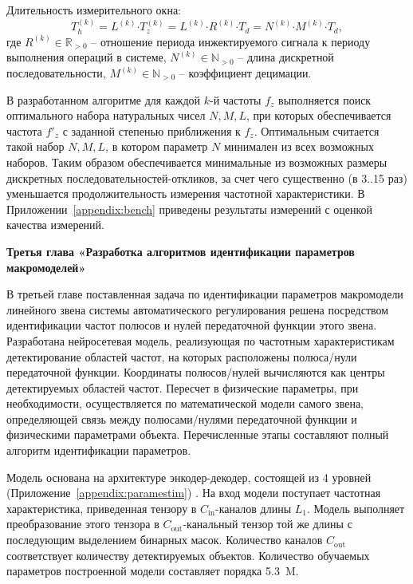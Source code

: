 \documentclass[a4paper, 14pt]{extarticle}
\begin{document}
    Длительность измерительного окна:
    \begin{equation*}
        T^{(k)}_{h} = L^{(k)} \mathord{\cdot} T^{(k)}_{z} = L^{(k)} \mathord{\cdot} R^{(k)} \mathord{\cdot} T_{d} = N^{(k)} \mathord{\cdot} M^{(k)} \mathord{\cdot} T_d,
    \end{equation*}
    где ${R^{(k)} \in \mathbb{R}_{>0}}$ -- отношение периода инжектируемого сигнала к периоду выполнения операций в системе, ${N^{(k)} \in \mathbb{N}_{>0}}$ -- длина дискретной последовательности, ${M^{(k)} \in \mathbb{N}_{>0}}$ -- коэффициент децимации.

    В разработанном алгоритме для каждой $k$-й частоты ${f_z}$ выполняется поиск оптимального набора натуральных чисел ${N, M, L}$, при которых обеспечивается частота ${f'_z}$ с заданной степенью приближения к ${f_z}$. Оптимальным считается такой набор ${N, M, L}$, в котором параметр $N$ минимален из всех возможных наборов. Таким образом обеспечивается минимальные из возможных размеры дискретных последовательностей-откликов, за счет чего существенно (в 3..15 раз) уменьшается продолжительность измерения частотной характеристики. В Приложении~\ref{appendix:bench} приведены результаты измерений с оценкой качества измерений.

    \noindent\textbf{Третья глава «Разработка алгоритмов идентификации параметров макромоделей»}\par
    В третьей главе поставленная задача по идентификации параметров макромодели линейного звена системы автоматического регулирования решена посредством идентификации частот полюсов и нулей передаточной функции этого звена. Разработана нейросетевая модель, реализующая по частотным характеристикам детектирование областей частот, на которых расположены полюса/нули передаточной функции. Координаты полюсов/нулей вычисляются как центры детектируемых областей частот. Пересчет в физические параметры, при необходимости, осуществляется по математической модели самого звена, определяющей связь между полюсами/нулями передаточной функции и физическими параметрами объекта. Перечисленные этапы составляют полный алгоритм идентификации параметров.

    Модель основана на архитектуре энкодер-декодер, состоящей из 4 уровней (Приложение~\ref{appendix:paramestim}) \cite{gorbunov2026freqrespencoder}. На вход модели поступает частотная характеристика, приведенная тензору в ${C_{\text{in}}}$-каналов длины ${L_1}$. Модель выполняет преобразование этого тензора в ${C_{\text{out}}}$-канальный тензор той же длины с последующим выделением бинарных масок. Количество каналов ${C_\text{out}}$ соответствует количеству детектируемых объектов. Количество обучаемых параметров построенной модели составляет порядка \num{5.3}~M.
    
\end{document}
